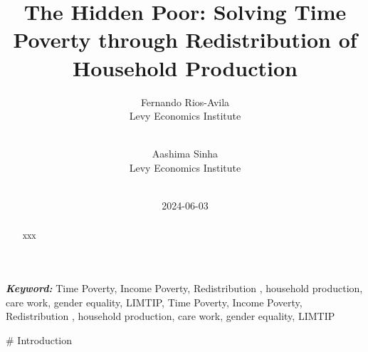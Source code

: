 \documentclass[
  11pt,
]{article}
\title{The Hidden Poor: Solving Time Poverty through Redistribution of
Household Production}
\author{
Fernando Rios-Avila\\
Levy Economics Institute\\
\\
\and 
Aashima Sinha\\
Levy Economics Institute\\
\\
}
\date{2024-06-03}
\begin{document}
\def\spacingset#1{\renewcommand{\baselinestretch}%
{#1}\small\normalsize} \spacingset{1}


\maketitle
\begin{abstract}
xxx
\end{abstract}
 
\vspace{.2in}

\textbf{\textit{Keyword: }}
    Time Poverty, Income Poverty, Redistribution , household production,
care work, gender equality, LIMTIP, 
    Time Poverty, Income Poverty, Redistribution , household production,
care work, gender equality, LIMTIP 


\thispagestyle{empty}
\clearpage{}
\newpage
\spacingset{1.2} %
\# Introduction
\end{document}
